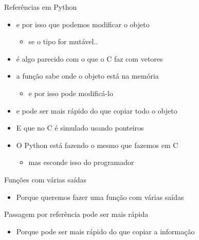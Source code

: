 \documentclass{beamer}
\begin{document}
\begin{frame}[<+->]{Referências em Python}
  \begin{itemize}
    \item e por isso que podemos modificar o objeto
      \begin{itemize}
        \item se o tipo for mutável..
      \end{itemize}
    \item é algo parecido com o que o C faz com vetores
    \item a função sabe onde o objeto está na memória
      \begin{itemize}
        \item e por isso pode modificá-lo
      \end{itemize}
    \item e pode ser mais rápido do que copiar todo o objeto
  \end{itemize}

  \bigskip
  \begin{itemize}
    \item E que no C é simulado usando ponteiros
    \item O Python está fazendo o mesmo que fazemos em C
      \begin{itemize}
        \item mas esconde isso do programador
      \end{itemize}
  \end{itemize}
\end{frame}

\begin{frame}[<+->]{Funções com várias saídas}
  \begin{itemize}
    \item Porque queremos fazer uma função com várias saídas
  \end{itemize}

  \bigskip
  \action{}
\end{frame}

\begin{frame}[<+->]{Passagem por referência pode ser mais rápida}
  \begin{itemize}
    \item Porque pode ser mais rápido do que copiar a informação
  \end{itemize}

  \bigskip
  \action{}

  \bigskip
\end{frame}
\end{document}
